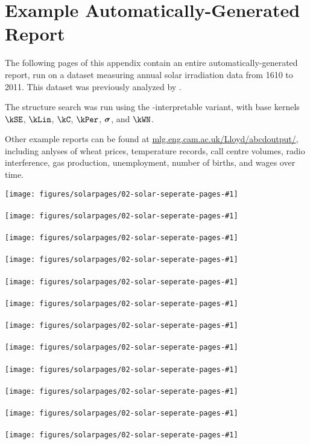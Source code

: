 \chapter{Example Automatically-Generated Report}
\label{ch:example-solar}

The following pages of this appendix contain an entire automatically-generated report, run on a dataset measuring annual solar irradiation data from 1610 to 2011.
This dataset was previously analyzed by \citet{lean1995reconstruction}.

The structure search was run using the \procedurename-interpretable variant, with base kernels $\kSE$, $\kLin$, $\kC$, $\kPer$, ${\boldsymbol{\sigma}}$, and $\kWN$.

Other example reports can be found at \url{mlg.eng.cam.ac.uk/Lloyd/abcdoutput/}, including anlyses of wheat prices, temperature records, call centre volumes, radio interference, gas production, unemployment, number of births, and wages over time.

\newcommand{\solarreportpage}[1]{\texttt{[image: figures/solarpages/02-solar-seperate-pages-\#1]}}

\clearpage


\solarreportpage{2}
\\ \vspace{1cm} \\
\solarreportpage{3}
\\ \vspace{1cm} \\
\solarreportpage{4}
\\ \vspace{1cm} \\
\solarreportpage{5}
\\ \vspace{1cm} \\
\solarreportpage{6}
\\ \vspace{1cm} \\
\solarreportpage{7}
\\ \vspace{1cm} \\
\solarreportpage{8}
\\ \vspace{1cm} \\
\solarreportpage{9}
\\ \vspace{1cm} \\
\solarreportpage{10}
\\ \vspace{1cm} \\
\solarreportpage{11}
\\ \vspace{1cm} \\
\solarreportpage{12}
\\ \vspace{1cm} \\
\solarreportpage{13}

